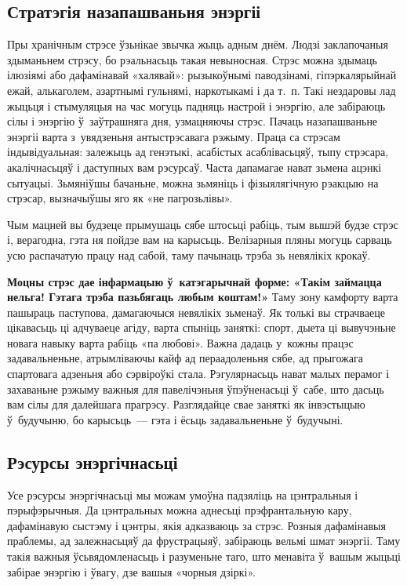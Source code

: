\subsection*{Стратэгія назапашваньня энэргіі} Пры хранічным стрэсе ўзьнікае звычка жыць адным днём. Людзі заклапочаныя здыманьнем стрэсу, бо рэальнасьць такая невыносная. Стрэс можна здымаць ілюзіямі або дафамінавай «халявай»: рызыкоўнымі паводзінамі, гіпэркалярыйнай ежай, алькаголем, азартнымі гульнямі, наркотыкамі і да т.~п. Такі нездаровы лад жыцьця і стымуляцыя на час могуць падняць настрой і энэргію, але забіраюць сілы і энэргію ў~заўтрашняга дня, узмацняючы стрэс. Пачаць назапашваньне энэргіі варта з~увядзеньня антыстрэсавага рэжыму. Праца са стрэсам індывідуальная: залежыць ад генэтыкі, асабістых асаблівасьцяў, тыпу стрэсара, акалічнасьцяў і даступных вам рэсурсаў. Часта дапамагае нават зьмена ацэнкі сытуацыі. Зьмяніўшы бачаньне, можна зьмяніць і фізыялягічную рэакцыю на стрэсар, вызначыўшы яго як «не пагрозьлівы».

Чым мацней вы будзеце прымушаць сябе штосьці рабіць, тым вышэй будзе стрэс і, верагодна, гэта ня пойдзе вам на карысьць. Велізарныя пляны могуць сарваць усю распачатую працу над сабой, таму пачынаць трэба зь невялікіх крокаў.

\textbf{Моцны стрэс дае інфармацыю ў~катэгарычнай форме: «Такім займацца нельга! Гэтага трэба пазьбягаць любым коштам!»} Таму зону камфорту варта пашыраць паступова, дамагаючыся невялікіх зьменаў. Як толькі вы страчваеце цікавасьць ці адчуваеце агіду, варта спыніць заняткі: спорт, дыета ці вывучэньне новага навыку варта рабіць «па любові». Важна дадаць у~кожны працэс задавальненьне, атрымліваючы кайф ад пераадоленьня сябе, ад прыгожага спартовага адзеньня або сэрвіроўкі стала. Рэгулярнасьць нават малых перамог і захаваньне рэжыму важныя для павелічэньня ўпэўненасьці ў~сабе, што дасьць вам сілы для далейшага прагрэсу. Разглядайце свае заняткі як інвэстыцыю ў~будучыню, бо карысьць~--- гэта і ёсьць задавальненьне ў~будучыні.

\subsection*{Рэсурсы энэргічнасьці}

Усе рэсурсы энэргічнасьці мы можам умоўна падзяліць на цэнтральныя і пэрыфэрычныя. Да цэнтральных можна аднесьці прэфрантальную кару, дафамінавую сыстэму і цэнтры, якія адказваюць за стрэс. Розныя дафамінавыя праблемы, ад залежнасьцяў да фрустрацыяў, забіраюць вельмі шмат энэргіі. Таму такія важныя ўсьвядомленасьць і разуменьне таго, што менавіта ў~вашым жыцьці забірае энэргію і ўвагу, дзе вашыя «чорныя дзіркі».

